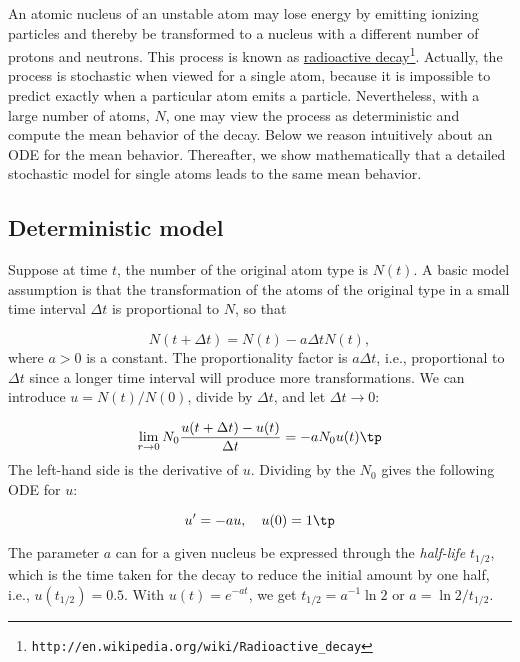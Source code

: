 \documentclass[graybox,sectrefs,envcountresetchap,open=right,final]{svmonodo}
\begin{document}

An atomic nucleus of an unstable atom may lose energy by emitting
ionizing particles and thereby be transformed to a nucleus with a
different number of protons and neutrons.  This process is known as
\href{{http://en.wikipedia.org/wiki/Radioactive_decay}}{radioactive decay}\footnote{\texttt{http://en.wikipedia.org/wiki/Radioactive\_decay}}.
Actually, the process is stochastic when viewed for a single atom,
because it is impossible to predict exactly when a particular atom
emits a particle. Nevertheless, with a large number of atoms, $N$, one
may view the process as deterministic and compute the mean behavior of
the decay. Below we reason intuitively about an ODE for the mean
behavior. Thereafter, we show mathematically that a detailed stochastic model
for single atoms leads to the same mean behavior.

\subsection{Deterministic model}

Suppose at time $t$, the number of the original atom type is $N(t)$.
A basic model assumption is that the transformation of the atoms of the original
type in a small time interval $\Delta t$ is proportional to
$N$, so that

\[ N(t+\Delta t) = N(t) - a\Delta t N(t),\]
where $a>0$ is a constant. The proportionality factor is $a\Delta t$, i.e.,
proportional to $\Delta t$ since a longer time interval will produce more
transformations.
We can introduce $u=N(t)/N(0)$, divide by
$\Delta t$, and let $\Delta t\rightarrow 0$:

\[ \lim_{r\rightarrow 0}
N_0\frac{u(t+\Delta t) - u(t)}{\Delta t} = - a N_0 u(t)\tp\]
The left-hand side is the derivative of $u$. Dividing by the $N_0$ gives
the following ODE for $u$:

\begin{equation}
u^{\prime} = -au,\quad u(0)=1
\tp
\end{equation}

The parameter $a$ can for a given nucleus be expressed through the
\emph{half-life} $t_{1/2}$, which is the time taken for the decay to reduce the
initial amount by one half, i.e., $u(t_{1/2}) = 0.5$.
With $u(t)=e^{-at}$, we get $t_{1/2}=a^{-1}\ln 2$ or $a=\ln 2/t_{1/2}$.

\end{document}
